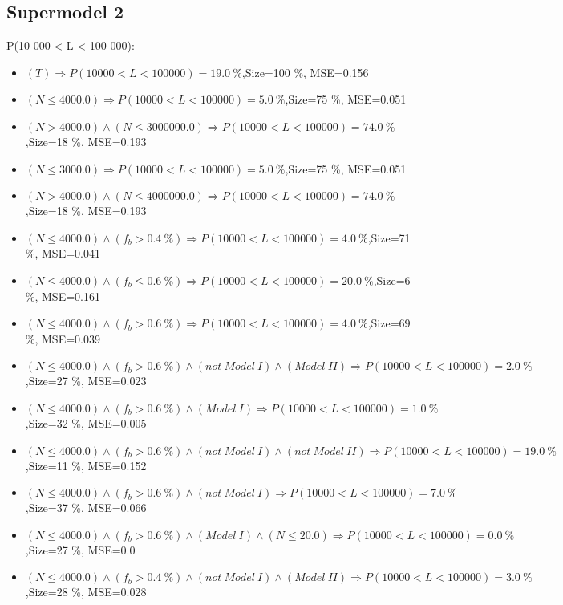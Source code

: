 \documentclass[numbered]{CSL}
\begin{document}
\subsection{Supermodel 2}
P(10 000 < L < 100 000):
\begin{itemize}
\item $(T) \Rightarrow P(10 000 < L < 100 000) = 19.0~\%$,\hfill Size=100 \%, MSE=0.156
\item $(N \leq 4000.0) \Rightarrow P(10 000 < L < 100 000) = 5.0~\%$,\hfill Size=75 \%, MSE=0.051
\item $(N > 4000.0) \land (N \leq 3000000.0) \Rightarrow P(10 000 < L < 100 000) = 74.0~\%$,\hfill Size=18 \%, MSE=0.193
\item $(N \leq 3000.0) \Rightarrow P(10 000 < L < 100 000) = 5.0~\%$,\hfill Size=75 \%, MSE=0.051
\item $(N > 4000.0) \land (N \leq 4000000.0) \Rightarrow P(10 000 < L < 100 000) = 74.0~\%$,\hfill Size=18 \%, MSE=0.193
\item $(N \leq 4000.0) \land (f_b > 0.4~\%) \Rightarrow P(10 000 < L < 100 000) = 4.0~\%$,\hfill Size=71 \%, MSE=0.041
\item $(N \leq 4000.0) \land (f_b \leq 0.6~\%) \Rightarrow P(10 000 < L < 100 000) = 20.0~\%$,\hfill Size=6 \%, MSE=0.161
\item $(N \leq 4000.0) \land (f_b > 0.6~\%) \Rightarrow P(10 000 < L < 100 000) = 4.0~\%$,\hfill Size=69 \%, MSE=0.039
\item $(N \leq 4000.0) \land (f_b > 0.6~\%) \land (not~Model~I) \land (Model~II) \Rightarrow P(10 000 < L < 100 000) = 2.0~\%$,\hfill Size=27 \%, MSE=0.023
\item $(N \leq 4000.0) \land (f_b > 0.6~\%) \land (Model~I) \Rightarrow P(10 000 < L < 100 000) = 1.0~\%$,\hfill Size=32 \%, MSE=0.005
\item $(N \leq 4000.0) \land (f_b > 0.6~\%) \land (not~Model~I) \land (not~Model~II) \Rightarrow P(10 000 < L < 100 000) = 19.0~\%$,\hfill Size=11 \%, MSE=0.152
\item $(N \leq 4000.0) \land (f_b > 0.6~\%) \land (not~Model~I) \Rightarrow P(10 000 < L < 100 000) = 7.0~\%$,\hfill Size=37 \%, MSE=0.066
\item $(N \leq 4000.0) \land (f_b > 0.6~\%) \land (Model~I) \land (N \leq 20.0) \Rightarrow P(10 000 < L < 100 000) = 0.0~\%$,\hfill Size=27 \%, MSE=0.0
\item $(N \leq 4000.0) \land (f_b > 0.4~\%) \land (not~Model~I) \land (Model~II) \Rightarrow P(10 000 < L < 100 000) = 3.0~\%$,\hfill Size=28 \%, MSE=0.028

\end{itemize}
\end{document}
